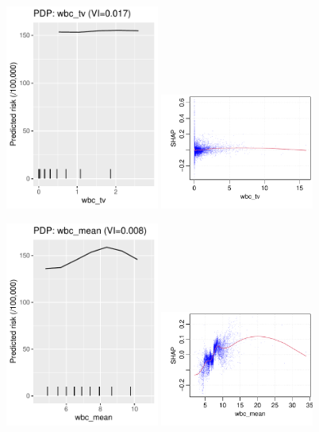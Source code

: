 \documentclass[12pt]{article}
\begin{document}
\begin{figure}[h]
\centering
\includegraphics[width=0.45\textwidth]{figures/pdp/wbc_tv.pdf}
\includegraphics[width=0.45\textwidth]{figures/shap/wbc_tv.pdf}
\end{figure}
\begin{figure}[h]
\centering
\includegraphics[width=0.45\textwidth]{figures/pdp/wbc_mean.pdf}
\includegraphics[width=0.45\textwidth]{figures/shap/wbc_mean.pdf}
\end{figure}
\end{document}
